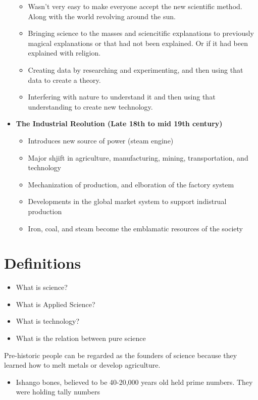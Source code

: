 \documentclass{article}
\begin{document}
\begin{itemize}
\begin{itemize}
\begin{itemize}
        \end{itemize}
      \item Wasn't very easy to make everyone accept
        the new scientific method. Along with the
        world revolving around the sun.
      \item Bringing science to the masses
        and sciencitific explanations to previously
        magical explanations or that had not been explained.
        Or if it had been explained with religion.
      \item Creating data by researching
        and experimenting, and then using that data
        to create a theory.
      \item Interfering with nature to understand it
        and then using that understanding to create
        new technology.
    \end{itemize}
  \item \textbf{The Industrial Reolution (Late 18th to mid 19th century)}
    \begin{itemize}
      \item Introduces new source of power (steam engine)
      \item Major shjift in agriculture, manufacturing,
        mining, transportation, and technology
      \item Mechanization of production, and elboration of the factory system
      \item Developments in the global market system to support indistrual production
      \item Iron, coal, and steam become the emblamatic resources of the society
    \end{itemize}
\end{itemize}

\section*{Definitions}
\begin{itemize}
  \item What is science?
  \item What is Applied Science?
  \item What is technology?
  \item What is the relation between pure science
\end{itemize}


Pre-historic people can be regarded as the founders
of science because they learned how to melt metals or develop agriculture.
\begin{itemize}
  \item Ishango bones, believed to be 40-20,000 years old held prime numbers.
   They were holding tally numbers
\end{itemize}
\end{document}

